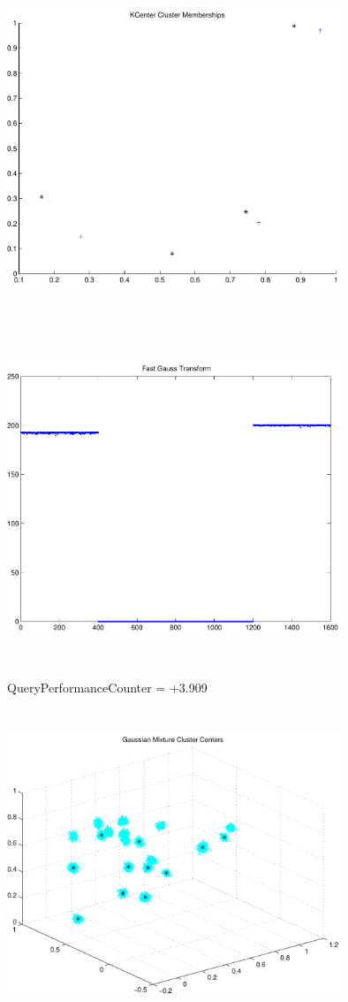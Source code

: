 \documentclass[9pt]{article}
\theoremstyle{plain}
\theoremstyle{definition}
\theoremstyle{remark}
\numberwithin{equation}{section}
\begin{document}
\includegraphics[width=10.0cm,height=10.0cm]{KCenterClusterMemberships_4_Centers.pdf}

\includegraphics[width=10.0cm,height=10.0cm]{FGT4_Centers.pdf}

QueryPerformanceCounter  =  +3.909
\includegraphics[width=10.0cm,height=10.0cm]{GaussianMixture_ClusterCenters20_Centers.pdf}
\end{document}
